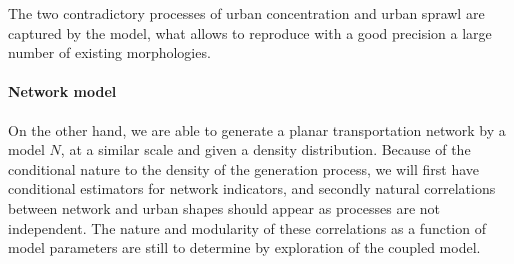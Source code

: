 

The two contradictory processes of urban concentration and urban sprawl are captured by the model, what allows to reproduce with a good precision a large number of existing morphologies.



\paragraph{Network model}


On the other hand, we are able to generate a planar transportation network by a model $N$, at a similar scale and given a density distribution. Because of the conditional nature to the density of the generation process, we will first have conditional estimators for network indicators, and secondly natural correlations between network and urban shapes should appear as processes are not independent. The nature and modularity of these correlations as a function of model parameters are still to determine by exploration of the coupled model.

